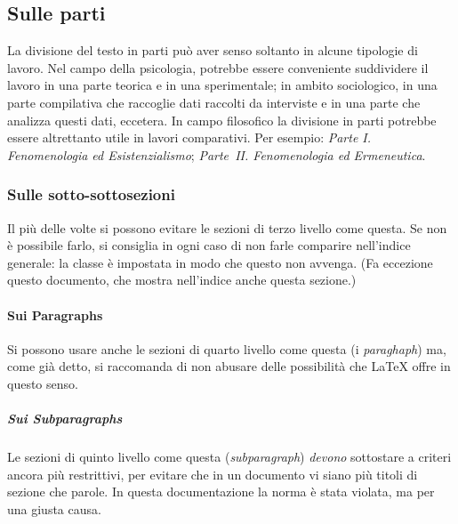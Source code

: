\documentclass{suftesi}
\begin{document}
\subsection{Sulle parti}

La divisione del testo in parti può aver senso soltanto in alcune tipologie di lavoro. Nel campo della psicologia, potrebbe essere conveniente suddividere il lavoro in una parte teorica e in una sperimentale; in ambito sociologico, in una parte compilativa che raccoglie dati raccolti da interviste e in una parte che analizza
questi dati, eccetera. In campo filosofico la divisione in parti potrebbe essere altrettanto utile in lavori comparativi. Per esempio: \emph{Parte I. Fenomenologia ed Esistenzialismo}; \emph{Parte~II. Fenomenologia ed Ermeneutica}.

\subsubsection{Sulle sotto-sottosezioni}

Il più delle volte si possono evitare le sezioni di terzo livello come
questa. Se non è possibile farlo, si consiglia in ogni caso di non
farle comparire nell'indice generale: la classe è impostata in modo
che questo non avvenga. (Fa eccezione questo documento, che mostra nell'indice anche questa sezione.)

\paragraph{Sui Paragraphs} 

Si possono usare anche le sezioni di quarto livello come questa (i
\emph{paraghaph}) ma, come già detto, si raccomanda di non abusare
delle possibilità che \LaTeX{} offre in questo senso.

\subparagraph{Sui Subparagraphs}

Le sezioni di quinto livello come questa (\emph{subparagraph})
\emph{devono} sottostare a criteri ancora più restrittivi, per
evitare che in un documento vi siano più titoli di sezione che
parole. In questa documentazione la norma è stata violata, ma per una
giusta causa.
\end{document}
